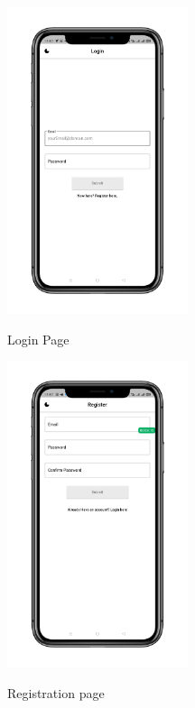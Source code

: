 \begin{figure}
\centering
\begin{minipage}{.5\textwidth}
  \centering
   \includegraphics[height=90mm]{Images & Logos/theme/CH_08_Light_1.png}
  \caption{Login Page}
\end{minipage}%
\begin{minipage}{.5\textwidth}
  \centering
   \includegraphics[height=90mm]{Images & Logos/theme/CH_08_Light_2.png}\\
  \caption{Registration page}
\end{minipage}


\end{figure}
